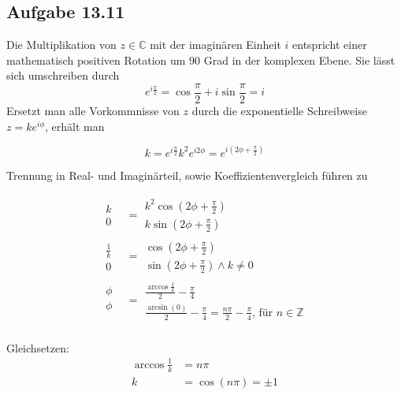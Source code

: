 \documentclass{standalone}
\begin{document}
\subsection{Aufgabe 13.11}
Die Multiplikation von $z \in \mathbb{C}$ mit der imaginären Einheit $i$ entspricht einer mathematisch positiven Rotation um 90 Grad in der komplexen Ebene.
Sie lässt sich umschreiben durch
$$ e^{i \frac{\pi}{2}} = \cos \frac{\pi}{2} + i \sin \frac{\pi}{2} = i $$
Ersetzt man alle Vorkommnisse von $z$ durch die exponentielle Schreibweise $z = k e^{i \phi}$, erhält man

$$ k = e^{i \frac{\pi}{2}} k^2e^{i 2 \phi} = e^{i (2 \phi + \frac{\pi}{2})} $$

Trennung in Real- und Imaginärteil, sowie Koeffizientenvergleich führen zu 

\begin{align}
    \begin{matrix} 
        k \\
        0
    \end{matrix}
    &=
    \begin{matrix} 
        k^2 \cos (2 \phi + \frac{\pi}{2}) \\
        k \sin (2 \phi + \frac{\pi}{2})
    \end{matrix} \\
    \begin{matrix} 
        \frac{1}{k} \\
        0
    \end{matrix}
    &=
    \begin{matrix} 
        \cos (2 \phi + \frac{\pi}{2}) \\
        \sin (2 \phi + \frac{\pi}{2}) \wedge k \neq 0
    \end{matrix} \\
    \begin{matrix} 
        \phi \\
        \phi \\
    \end{matrix}
    &=
    \begin{matrix} 
        \frac{\arccos \frac{1}{k}}{2} - \frac{\pi}{4} \\
        \frac{\arcsin (0)}{2} -\frac{\pi}{4} = \frac{n\pi}{2} -\frac{\pi}{4} \text{, für } n \in \mathbb{Z}
    \end{matrix} \\    
\end{align}

Gleichsetzen:
\begin{align}
    \arccos \frac{1}{k} &= n\pi \\
    k &= \cos (n\pi) = \pm 1
\end{align}
\end{document}

